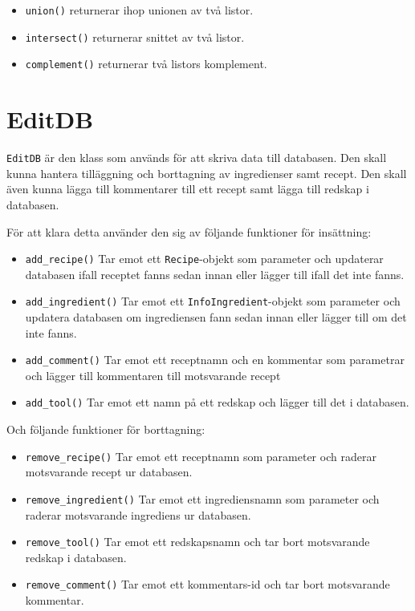 \begin{itemize}
\item \verb+union()+ returnerar ihop unionen av två listor.
\item \verb+intersect()+ returnerar snittet av två listor.
\item \verb+complement()+ returnerar två listors komplement.
\end{itemize}


\section{EditDB}

\verb+EditDB+ är den klass som används för att skriva data till databasen. Den
skall kunna hantera tilläggning och borttagning av ingredienser samt recept. Den
skall även kunna lägga till kommentarer till ett recept samt lägga till redskap
i databasen.

För att klara detta använder den sig av följande funktioner för insättning:

\begin{itemize}
\item \verb+add_recipe()+ Tar emot ett \verb+Recipe+-objekt som parameter och
  updaterar databasen ifall receptet fanns sedan innan eller lägger till ifall
  det inte fanns.

\item \verb+add_ingredient()+ Tar emot ett \verb+InfoIngredient+-objekt som
  parameter och updatera databasen om ingrediensen fann sedan innan eller lägger
  till om det inte fanns.

\item \verb+add_comment()+ Tar emot ett receptnamn och en kommentar som
  parametrar och lägger till kommentaren till motsvarande recept

\item \verb+add_tool()+ Tar emot ett namn på ett redskap och lägger till det i
  databasen.

\end{itemize}

Och följande funktioner för borttagning:

\begin{itemize}

\item \verb+remove_recipe()+ Tar emot ett receptnamn som parameter och raderar
  motsvarande recept ur databasen.

\item \verb+remove_ingredient()+ Tar emot ett ingrediensnamn som parameter och
  raderar motsvarande ingrediens ur databasen.

\item \verb+remove_tool()+ Tar emot ett redskapsnamn och tar bort motsvarande
  redskap i databasen.

\item \verb+remove_comment()+ Tar emot ett kommentars-id och tar bort
  motsvarande kommentar.
  
\end{itemize}


